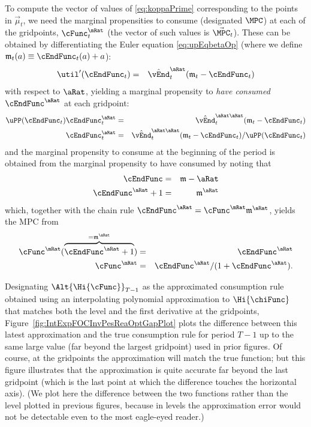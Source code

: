 \documentclass[titlepage]{\econtex}
\begin{document}
To compute the vector of values of \eqref{eq:koppaPrime} corresponding
to the points in $\vec{\mu}_{t}$, we need the marginal propensities to
consume (designated $\MPC$) at each of the gridpoints,
$\cFunc^{\mRat}_{t}$ (the vector of such values is 
$\vec{\MPC}_{t}$).  These can be obtained by differentiating the
Euler equation \eqref{eq:upEqbetaOp} (where we define
$\mathfrak{m}_{t}({a}) \equiv \cEndFunc_{t}({a})+{a}$):
\begin{eqnarray}
\util^{\prime}({\cEndFunc}_{t})  & = & \hat{\vEnd}_{t}^{\aRat}(\mathfrak{m}_{t}-{\cEndFunc}_{t})
\end{eqnarray}
with respect to $\aRat$, yielding a marginal propensity to
\textit{have consumed} $\cEndFunc^{\aRat}$ at each gridpoint:
\begin{eqnarray}
   \uPP(\cEndFunc_{t})\cEndFunc_{t}^{\aRat} & = & \hat{\vEnd}_{t}^{\aRat\aRat}(\mathfrak{m}_{t}-{\cEndFunc}_{t})
\\ \cEndFunc_{t}^{\aRat} & = & \hat{\vEnd}_{t}^{\aRat\aRat}(\mathfrak{m}_{t}-{\cEndFunc}_{t})/\uPP(\cEndFunc_{t})
\end{eqnarray}
and the marginal propensity to consume at the beginning of the period is obtained from the marginal
propensity to have consumed by noting that
\begin{eqnarray*}
   \cEndFunc & = & \mathfrak{m}-\aRat
\\ \cEndFunc^{\aRat}+1 & = & \mathfrak{m}^{\aRat}
\end{eqnarray*}
which, together with the chain rule $\cEndFunc^{\aRat}  = \cFunc^{\mRat}\mathfrak{m}^{\aRat}$,
yields the MPC from
\begin{eqnarray}
   \cFunc^{\mRat}(\overbrace{\cEndFunc^{\aRat}+1}^{=\mathfrak{m}^{\aRat}}) & = & \cEndFunc^{\aRat}
\\ \cFunc^{\mRat} & = & \cEndFunc^{\aRat}/(1+\cEndFunc^{\aRat}) \label{eq:MPCfromMPTHC}.
\end{eqnarray}


Designating $\Alt{\Hi{\cFunc}}_{T-1}$ as the approximated consumption rule
obtained using an interpolating polynomial approximation to $\Hi{\chiFunc}$
that matches both the level and the first derivative at the
gridpoints, Figure~\ref{fig:IntExpFOCInvPesReaOptGapPlot} plots the
difference between this latest approximation and the true consumption
rule for period $T-1$ up to the same large value (far beyond the
largest gridpoint) used in prior figures.  Of course, at the
gridpoints the approximation will match the true function; but this
figure illustrates that the approximation is quite accurate far beyond
the last gridpoint (which is the last point at which the difference
touches the horizontal axis).  (We plot here the difference between the
two functions rather than the level plotted in previous figures, because
in levels the approximation error would not be detectable even to the
most eagle-eyed reader.)
\end{document}
